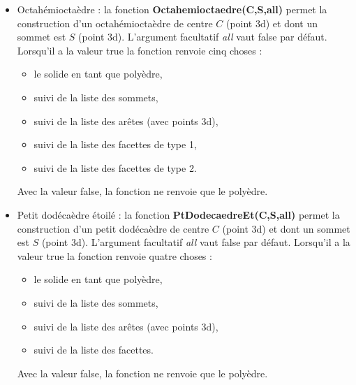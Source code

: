 \begin{itemize}
\item Octahémioctaèdre : la fonction \textbf{Octahemioctaedre(C,S,all)} permet la construction d'un octahémioctaèdre de centre $C$ (point 3d) et dont un sommet est $S$ (point 3d). L'argument facultatif \emph{all} vaut false par défaut. Lorsqu'il a la valeur true la fonction renvoie cinq choses :
    \begin{itemize}
        \item le solide en tant que polyèdre,
        \item suivi de la liste des sommets,
        \item suivi de la liste des arêtes (avec points 3d),
        \item suivi de la liste des facettes de type 1,
        \item suivi de la liste des facettes de type 2.
    \end{itemize}
Avec la valeur false, la fonction ne renvoie que le polyèdre.

\item Petit dodécaèdre étoilé : la fonction \textbf{PtDodecaedreEt(C,S,all)} permet la construction d'un petit dodécaèdre de centre $C$ (point 3d) et dont un sommet est $S$ (point 3d). L'argument facultatif \emph{all} vaut false par défaut. Lorsqu'il a la valeur true la fonction renvoie quatre choses :
    \begin{itemize}
        \item le solide en tant que polyèdre,
        \item suivi de la liste des sommets,
        \item suivi de la liste des arêtes (avec points 3d),
        \item suivi de la liste des facettes.
    \end{itemize}
Avec la valeur false, la fonction ne renvoie que le polyèdre.
\end{itemize}

